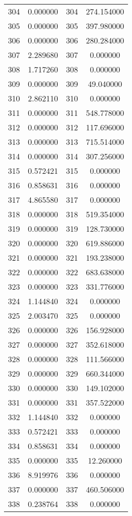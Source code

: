 \documentclass[12pt]{article}
\begin{document}
\begin{longtable}{@{}cccc@{}}
304 & 0.000000 & 304 & 274.154000 \\
305 & 0.000000 & 305 & 397.980000 \\
306 & 0.000000 & 306 & 280.284000 \\
307 & 2.289680 & 307 & 0.000000 \\
308 & 1.717260 & 308 & 0.000000 \\
309 & 0.000000 & 309 & 49.040000 \\
310 & 2.862110 & 310 & 0.000000 \\
311 & 0.000000 & 311 & 548.778000 \\
312 & 0.000000 & 312 & 117.696000 \\
313 & 0.000000 & 313 & 715.514000 \\
314 & 0.000000 & 314 & 307.256000 \\
315 & 0.572421 & 315 & 0.000000 \\
316 & 0.858631 & 316 & 0.000000 \\
317 & 4.865580 & 317 & 0.000000 \\
318 & 0.000000 & 318 & 519.354000 \\
319 & 0.000000 & 319 & 128.730000 \\
320 & 0.000000 & 320 & 619.886000 \\
321 & 0.000000 & 321 & 193.238000 \\
322 & 0.000000 & 322 & 683.638000 \\
323 & 0.000000 & 323 & 331.776000 \\
324 & 1.144840 & 324 & 0.000000 \\
325 & 2.003470 & 325 & 0.000000 \\
326 & 0.000000 & 326 & 156.928000 \\
327 & 0.000000 & 327 & 352.618000 \\
328 & 0.000000 & 328 & 111.566000 \\
329 & 0.000000 & 329 & 660.344000 \\
330 & 0.000000 & 330 & 149.102000 \\
331 & 0.000000 & 331 & 357.522000 \\
332 & 1.144840 & 332 & 0.000000 \\
333 & 0.572421 & 333 & 0.000000 \\
334 & 0.858631 & 334 & 0.000000 \\
335 & 0.000000 & 335 & 12.260000 \\
336 & 8.919976 & 336 & 0.000000 \\
337 & 0.000000 & 337 & 460.506000 \\
338 & 0.238764 & 338 & 0.000000 \\

\end{longtable}
\end{document}
